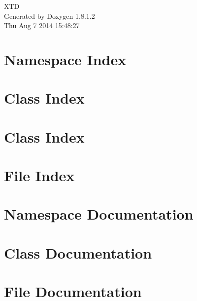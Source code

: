 \documentclass{book}
\begin{document}
\hypersetup{pageanchor=false,citecolor=blue}
\begin{titlepage}
\vspace*{7cm}
\begin{center}
{\Large X\-T\-D }\\
\vspace*{1cm}
{\large Generated by Doxygen 1.8.1.2}\\
\vspace*{0.5cm}
{\small Thu Aug 7 2014 15:48:27}\\
\end{center}
\end{titlepage}
\clearemptydoublepage
{}
\tableofcontents
\clearemptydoublepage
{}
\hypersetup{pageanchor=true,citecolor=blue}
\chapter{Namespace Index}

\chapter{Class Index}

\chapter{Class Index}

\chapter{File Index}

\chapter{Namespace Documentation}


\chapter{Class Documentation}




























\chapter{File Documentation}

\printindex
\end{document}
